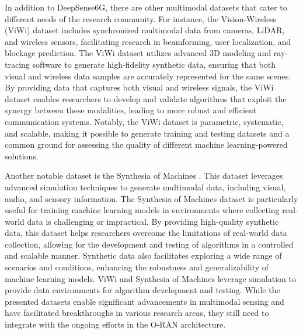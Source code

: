 In addition to DeepSense6G, there are other multimodal datasets that cater to different needs of the research community. For instance, the Vision-Wireless (ViWi) dataset \cite{ViWi} includes synchronized multimodal data from cameras, LiDAR, and wireless sensors, facilitating research in beamforming, user localization, and blockage prediction. The ViWi dataset utilizes advanced 3D modeling and ray-tracing software to generate high-fidelity synthetic data, ensuring that both visual and wireless data samples are accurately represented for the same scenes. By providing data that captures both visual and wireless signals, the ViWi dataset enables researchers to develop and validate algorithms that exploit the synergy between these modalities, leading to more robust and efficient communication systems. Notably, the ViWi dataset is parametric, systematic, and scalable, making it possible to generate training and testing datasets and a common ground for assessing the quality of different machine learning-powered solutions.

Another notable dataset is the Synthesia of Machines \cite{Synthesia}. This dataset leverages advanced simulation techniques to generate multimodal data, including visual, audio, and sensory information. The Synthesia of Machines dataset is particularly useful for training machine learning models in environments where collecting real-world data is challenging or impractical. By providing high-quality synthetic data, this dataset helps researchers overcome the limitations of real-world data collection, allowing for the development and testing of algorithms in a controlled and scalable manner. Synthetic data also facilitates exploring a wide range of scenarios and conditions, enhancing the robustness and generalizability of machine learning models. ViWi and Synthesia of Machines leverage simulation to provide data environments for algorithm development and testing. While the presented datasets enable significant advancements in multimodal sensing and have facilitated breakthroughs in various research areas, they still need to integrate with the ongoing efforts in the O-RAN architecture. 


